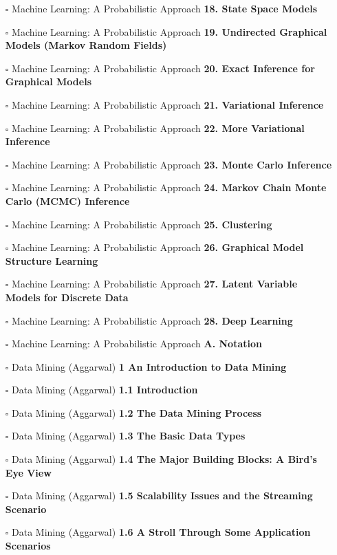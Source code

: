 \documentclass[a4, landscape, 12pt]{article}
\newcommand{\checkbox}{$\square$}%
\begin{document}
\begin{itemize}
{}
\item [\checkbox]  Machine Learning: A Probabilistic Approach \textbf{ 18. State Space Models
}
\item [\checkbox]  Machine Learning: A Probabilistic Approach \textbf{ 19. Undirected Graphical Models (Markov Random Fields)
}
\item [\checkbox]  Machine Learning: A Probabilistic Approach \textbf{ 20. Exact Inference for Graphical Models
}
\item [\checkbox]  Machine Learning: A Probabilistic Approach \textbf{ 21. Variational Inference
}
\item [\checkbox]  Machine Learning: A Probabilistic Approach \textbf{ 22. More Variational Inference
}
\item [\checkbox]  Machine Learning: A Probabilistic Approach \textbf{ 23. Monte Carlo Inference
}
\item [\checkbox]  Machine Learning: A Probabilistic Approach \textbf{ 24. Markov Chain Monte Carlo (MCMC) Inference
}
\item [\checkbox]  Machine Learning: A Probabilistic Approach \textbf{ 25. Clustering
}
\item [\checkbox]  Machine Learning: A Probabilistic Approach \textbf{ 26. Graphical Model Structure Learning
}
\item [\checkbox]  Machine Learning: A Probabilistic Approach \textbf{ 27. Latent Variable Models for Discrete Data
}
\item [\checkbox]  Machine Learning: A Probabilistic Approach \textbf{ 28. Deep Learning
}
\item [\checkbox]  Machine Learning: A Probabilistic Approach \textbf{ A. Notation
}
\item [\checkbox]  Data Mining (Aggarwal) \textbf{ 1 An Introduction to Data Mining
}
\item [\checkbox]  Data Mining (Aggarwal) \textbf{ 1.1 Introduction
}
\item [\checkbox]  Data Mining (Aggarwal) \textbf{ 1.2 The Data Mining Process
}
\item [\checkbox]  Data Mining (Aggarwal) \textbf{ 1.3 The Basic Data Types
}
\item [\checkbox]  Data Mining (Aggarwal) \textbf{ 1.4 The Major Building Blocks: A Bird’s Eye View
}
\item [\checkbox]  Data Mining (Aggarwal) \textbf{ 1.5 Scalability Issues and the Streaming Scenario
}
\item [\checkbox]  Data Mining (Aggarwal) \textbf{ 1.6 A Stroll Through Some Application Scenarios
}
\end{itemize}
\end{document}

